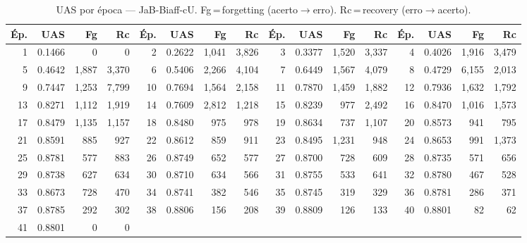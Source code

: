 \begin{table}[ht]
\centering\scriptsize
\caption{UAS por época --- JaB-Biaff-cU. Fg\,=\,forgetting (acerto$\to$erro). Rc\,=\,recovery (erro$\to$acerto).}
\label{tab:uas-predictions-results-jabuticabert-biaffine}
\begin{tabular}{rrrr rrrr rrrr rrrr}
\toprule
\textbf{Ép.} & \textbf{UAS} & \textbf{Fg} & \textbf{Rc} & \textbf{Ép.} & \textbf{UAS} & \textbf{Fg} & \textbf{Rc} & \textbf{Ép.} & \textbf{UAS} & \textbf{Fg} & \textbf{Rc} & \textbf{Ép.} & \textbf{UAS} & \textbf{Fg} & \textbf{Rc} \\
\midrule
1 & 0.1466 & 0 & 0 & 2 & 0.2622 & 1,041 & 3,826 & 3 & 0.3377 & 1,520 & 3,337 & 4 & 0.4026 & 1,916 & 3,479 \\
5 & 0.4642 & 1,887 & 3,370 & 6 & 0.5406 & 2,266 & 4,104 & 7 & 0.6449 & 1,567 & 4,079 & 8 & 0.4729 & 6,155 & 2,013 \\
9 & 0.7447 & 1,253 & 7,799 & 10 & 0.7694 & 1,564 & 2,158 & 11 & 0.7870 & 1,459 & 1,882 & 12 & 0.7936 & 1,632 & 1,792 \\
13 & 0.8271 & 1,112 & 1,919 & 14 & 0.7609 & 2,812 & 1,218 & 15 & 0.8239 & 977 & 2,492 & 16 & 0.8470 & 1,016 & 1,573 \\
17 & 0.8479 & 1,135 & 1,157 & 18 & 0.8480 & 975 & 978 & 19 & 0.8634 & 737 & 1,107 & 20 & 0.8573 & 941 & 795 \\
21 & 0.8591 & 885 & 927 & 22 & 0.8612 & 859 & 911 & 23 & 0.8495 & 1,231 & 948 & 24 & 0.8653 & 991 & 1,373 \\
25 & 0.8781 & 577 & 883 & 26 & 0.8749 & 652 & 577 & 27 & 0.8700 & 728 & 609 & 28 & 0.8735 & 571 & 656 \\
29 & 0.8738 & 627 & 634 & 30 & 0.8710 & 634 & 566 & 31 & 0.8755 & 533 & 641 & 32 & 0.8780 & 467 & 528 \\
33 & 0.8673 & 728 & 470 & 34 & 0.8741 & 382 & 546 & 35 & 0.8745 & 319 & 329 & 36 & 0.8781 & 286 & 371 \\
37 & 0.8785 & 292 & 302 & 38 & 0.8806 & 156 & 208 & 39 & 0.8809 & 126 & 133 & 40 & 0.8801 & 82 & 62 \\
41 & 0.8801 & 0 & 0 &  & & &  &  & & &  &  & & &  \\
\bottomrule
\end{tabular}
\end{table}
